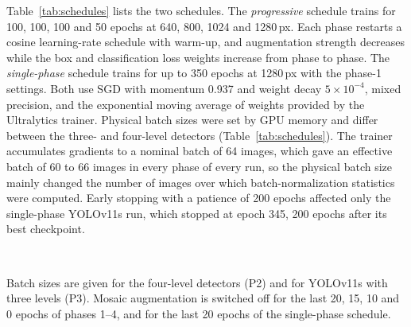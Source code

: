 \documentclass[preprint,12pt]{elsarticle}
\begin{document}
Table~\ref{tab:schedules} lists the two schedules. The \emph{progressive} schedule
trains for 100, 100, 100 and 50 epochs at 640, 800, 1024 and 1280\,px. Each phase
restarts a cosine learning-rate schedule with warm-up, and augmentation strength
decreases while the box and classification loss weights increase from phase to
phase. The \emph{single-phase} schedule trains for up to 350 epochs at 1280\,px
with the phase-1 settings. Both use SGD with momentum 0.937 and weight decay
$5\times10^{-4}$, mixed precision, and the exponential moving average of weights
provided by the Ultralytics trainer. Physical batch sizes were set by GPU memory
and differ between the three- and four-level detectors (Table~\ref{tab:schedules}).
The trainer accumulates gradients to a nominal batch of 64 images, which gave an
effective batch of 60 to 66 images in every phase of every run, so the physical
batch size mainly changed the number of images over which batch-normalization
statistics were computed. Early stopping with a patience of 200 epochs affected
only the single-phase YOLOv11s run, which stopped at epoch 345, 200 epochs after
its best checkpoint.

\begin{table}[t]
\centering
\caption{Training schedules. Learning rates follow a cosine curve from lr$_0$ to
lr$_0\cdot f$ within each phase.}
\label{tab:schedules}
\footnotesize
{}
\\[2pt]
\begin{minipage}{\linewidth}\footnotesize
Batch sizes are given for the four-level detectors (P2) and for YOLOv11s with three
levels (P3). Mosaic augmentation is switched off for the last 20, 15, 10 and 0
epochs of phases 1--4, and for the last 20 epochs of the single-phase schedule.
\end{minipage}
\end{table}
\end{document}

